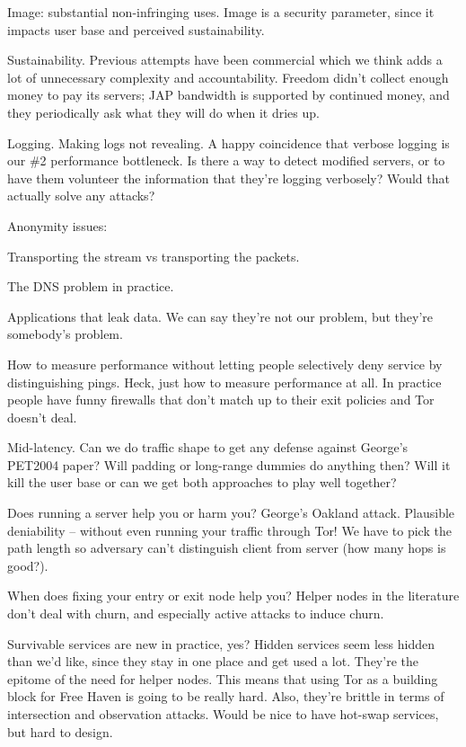 \documentclass{llncs}
\begin{document}
Image: substantial non-infringing uses. Image is a security parameter,
since it impacts user base and perceived sustainability.

Sustainability. Previous attempts have been commercial which we think
adds a lot of unnecessary complexity and accountability. Freedom didn't
collect enough money to pay its servers; JAP bandwidth is supported by
continued money, and they periodically ask what they will do when it
dries up.

Logging. Making logs not revealing. A happy coincidence that verbose
logging is our \#2 performance bottleneck. Is there a way to detect
modified servers, or to have them volunteer the information that they're
logging verbosely? Would that actually solve any attacks?


Anonymity issues:

Transporting the stream vs transporting the packets.

The DNS problem in practice.

Applications that leak data. We can say they're not our problem, but
they're somebody's problem.

How to measure performance without letting people selectively deny service
by distinguishing pings. Heck, just how to measure performance at all. In
practice people have funny firewalls that don't match up to their exit
policies and Tor doesn't deal.

Mid-latency. Can we do traffic shape to get any defense against George's
PET2004 paper? Will padding or long-range dummies do anything then? Will
it kill the user base or can we get both approaches to play well together?

Does running a server help you or harm you? George's Oakland attack.
Plausible deniability -- without even running your traffic through Tor! We
have to pick the path length so adversary can't distinguish client from
server (how many hops is good?).

When does fixing your entry or exit node help you?
Helper nodes in the literature don't deal with churn, and
especially active attacks to induce churn.

Survivable services are new in practice, yes? Hidden services seem
less hidden than we'd like, since they stay in one place and get used
a lot. They're the epitome of the need for helper nodes. This means
that using Tor as a building block for Free Haven is going to be really
hard. Also, they're brittle in terms of intersection and observation
attacks. Would be nice to have hot-swap services, but hard to design.
\end{document}
